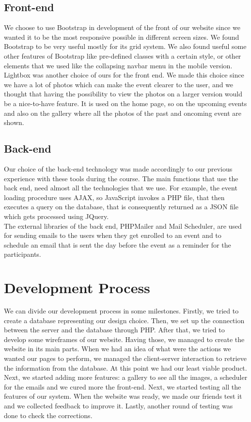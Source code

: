 \documentclass[a4paper]{article}
\begin{document}
	\subsection{Front-end}
	We choose to use Bootstrap in development of the front of our website since we wanted it to be the most responsive possible in different screen sizes. We found Bootstrap to be very useful mostly for its grid system. We also found useful some other features of Bootstrap like pre-defined classes with a certain style, or other elements that we used like the collapsing navbar menu in the mobile version.\\
	Lightbox was another choice of ours for the front end. We made this choice since we have a lot of photos which can make the event clearer to the user, and we thought that having the possibility to view the photos on a larger version would be a nice-to-have feature. It is used on the home page, so on the upcoming events and also on the gallery where all the photos of the past and oncoming event are shown.\\
	\subsection{Back-end}
	Our choice of the back-end technology was made accordingly to our previous experience with these tools during the course. The main functions that use the back end, need almost all the technologies that we use. For example, the event loading procedure uses AJAX, so JavaScript invokes a PHP file, that then executes a query on the database, that is consequently returned as a JSON file which gets processed using JQuery. \\ 
	The external libraries of the back end, PHPMailer and Mail Scheduler, are used for sending emails to the users when they get enrolled to an event and to schedule an email that is sent the day before the event as a reminder for the participants.

	\section{Development Process}
	We can divide our development process in some milestones. Firstly, we tried to create a database representing our design choice. Then, we set up the connection between the server and the database through PHP. After that, we tried to develop some wireframes of our website. Having those, we managed to create the website in its main parts. When we had an idea of what were the actions we wanted our pages to perform, we managed the client-server interaction to retrieve the information from the database. At this point we had our least viable product.  Next, we started adding more features: a gallery to see all the images, a scheduler for the emails and we cured more the front-end. Next, we started testing all the features of our system. When the website was ready, we made our friends test it and we collected feedback to improve it. Lastly, another round of testing was done to check the corrections.
	
\end{document}
